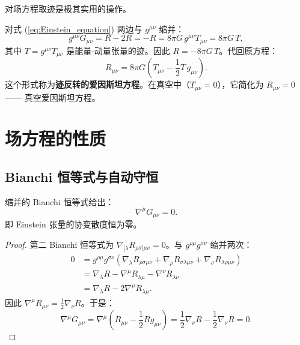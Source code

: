 对场方程取迹是极其实用的操作。

\begin{property}[爱因斯坦场方程的迹反转形式]
对式 (\ref{eq:Einstein_equation}) 两边与 $g^{\mu\nu}$ 缩并：
\begin{equation}
    g^{\mu\nu}G_{\mu\nu} = R - 2R = -R = 8\pi G \, g^{\mu\nu}T_{\mu\nu} = 8\pi G \, T,
\end{equation}
其中 $T = g^{\mu\nu}T_{\mu\nu}$ 是能量-动量张量的迹。因此 $R = -8\pi G \, T$。代回原方程：
\begin{equation}
    \boxed{R_{\mu\nu} = 8\pi G \left(T_{\mu\nu} - \frac{1}{2} T \, g_{\mu\nu}\right)}.
    \label{eq:trace_reversed}
\end{equation}
这个形式称为\textbf{迹反转的爱因斯坦方程}。在真空中（$T_{\mu\nu} = 0$），它简化为 $R_{\mu\nu} = 0$ —— 真空爱因斯坦方程。
\end{property}

\section{场方程的性质}
\label{sec:properties}

\subsection{Bianchi 恒等式与自动守恒}

\begin{theorem}
缩并的 Bianchi 恒等式给出：
\begin{equation}
    \boxed{\nabla^\mu G_{\mu\nu} = 0}.
    \label{eq:contracted_bianchi}
\end{equation}
即 Einstein 张量的协变散度恒为零。
\end{theorem}

\begin{proof}
第二 Bianchi 恒等式为 $\nabla_{[\lambda} R_{\rho\sigma]\mu\nu} = 0$。与 $g^{\rho\mu}g^{\sigma\nu}$ 缩并两次：
\begin{align}
    0 &= g^{\rho\mu}g^{\sigma\nu} \left(\nabla_\lambda R_{\rho\sigma\mu\nu} + \nabla_\rho R_{\sigma\lambda\mu\nu} + \nabla_\sigma R_{\lambda\rho\mu\nu}\right) \\
      &= \nabla_\lambda R - \nabla^\mu R_{\lambda\mu} - \nabla^\nu R_{\lambda\nu} \\
      &= \nabla_\lambda R - 2\nabla^\mu R_{\lambda\mu}.
\end{align}
因此 $\nabla^\mu R_{\mu\nu} = \frac{1}{2}\nabla_\nu R$。于是：
\begin{equation}
    \nabla^\mu G_{\mu\nu} = \nabla^\mu\left(R_{\mu\nu} - \frac{1}{2}R g_{\mu\nu}\right)
    = \frac{1}{2}\nabla_\nu R - \frac{1}{2}\nabla_\nu R = 0.
\end{equation}
\end{proof}


